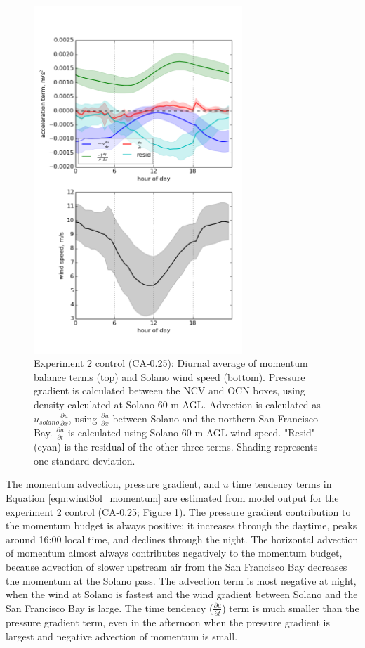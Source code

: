 \begin{figure}[here]
\includegraphics[width=0.7\textwidth]{ch3-wind/img/momentum_terms_diurnal_0pt25.png}
\caption{Experiment 2 control (CA-0.25): Diurnal average of momentum balance terms (top) and Solano wind speed (bottom).  Pressure gradient is calculated between the NCV and OCN boxes, using density calculated at Solano 60 m AGL.  Advection is calculated as $u_{solano}\frac{\partial u}{\partial x}$, using $\frac{\partial u}{\partial x}$ between Solano and the northern San Francisco Bay.  $\frac{\partial u}{\partial t}$ is calculated using Solano 60 m AGL wind speed.  "Resid" (cyan) is the residual of the other three terms.  Shading represents one standard deviation.}
\label{fig:windSol_MomTermsDiurn}
\end{figure}

The momentum advection, pressure gradient, and $u$ time tendency terms in Equation \ref{eqn:windSol_momentum} are estimated from model output for the experiment 2 control (CA-0.25; Figure \ref{fig:windSol_MomTermsDiurn}).  The pressure gradient contribution to the momentum budget is always positive; it increases through the daytime, peaks around 16:00 local time, and declines through the night.  The horizontal advection of momentum almost always contributes negatively to the momentum budget, because advection of slower upstream air from the San Francisco Bay decreases the momentum at the Solano pass.  The advection term is most negative at night, when the wind at Solano is fastest and the wind gradient between Solano and the San Francisco Bay is large. The time tendency ($\frac{\partial u}{\partial t}$) term is much smaller than the pressure gradient term, even in the afternoon when the pressure gradient is largest and negative advection of momentum is small.

